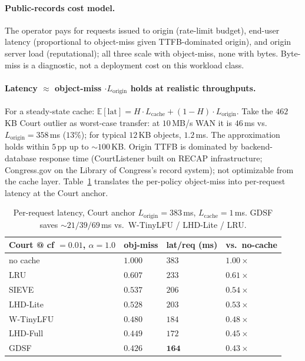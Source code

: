 \documentclass[letterpaper,twocolumn,10pt]{article}
\begin{document}
\paragraph{Public-records cost model.} The operator pays for
requests issued to origin (rate-limit budget), end-user latency
(proportional to object-miss given TTFB-dominated origin), and
origin server load (reputational); all three scale with object-miss,
none with bytes. Byte-miss is a diagnostic, not a deployment cost on
this workload class.

\paragraph{Latency $\approx$ object-miss $\cdot L_{\text{origin}}$
holds at realistic throughputs.} For a steady-state cache:
$\mathbb{E}[\text{lat}] = H \cdot L_{\text{cache}} + (1-H) \cdot
L_{\text{origin}}$. Take the $462$\,KB Court outlier as worst-case
transfer: at $10$\,MB/s WAN it is $46$\,ms vs.\ $L_{\text{origin}} =
358$\,ms ($13\%$); for typical $12$\,KB objects, $1.2$\,ms. The
approximation holds within $5$\,pp up to $\sim 100$\,KB. Origin TTFB
is dominated by backend-database response time (CourtListener built
on RECAP infrastructure; Congress.gov on the Library of Congress's
record system); not optimizable from the cache layer.
Table~\ref{tab:lat} translates the per-policy object-miss into
per-request latency at the Court anchor.

\begin{table}[t]
\centering
\footnotesize
\renewcommand{\arraystretch}{0.95}
\begin{tabularx}{\columnwidth}{@{}lXXX@{}}
\toprule
\textbf{Court @ cf $= 0.01$, $\alpha = 1.0$} & \textbf{obj-miss} & \textbf{lat/req (ms)} & \textbf{vs.\ no-cache} \\
\midrule
no cache  & $1.000$        & $383$ & $1.00\times$ \\
LRU       & $0.607$        & $233$ & $0.61\times$ \\
SIEVE     & $0.537$        & $206$ & $0.54\times$ \\
LHD-Lite  & $0.528$        & $203$ & $0.53\times$ \\
W-TinyLFU & $0.480$        & $184$ & $0.48\times$ \\
LHD-Full  & $0.449$        & $172$ & $0.45\times$ \\
GDSF      & $\mathbf{0.426}$ & $\mathbf{164}$ & $\mathbf{0.43\times}$ \\
\bottomrule
\end{tabularx}
\caption{Per-request latency, Court anchor $L_{\text{origin}} = 383$\,ms,
$L_{\text{cache}} = 1$\,ms. GDSF saves $\sim 21 / 39 / 69$\,ms vs.\
W-TinyLFU / LHD-Lite / LRU.}
\label{tab:lat}
\end{table}
\end{document}
